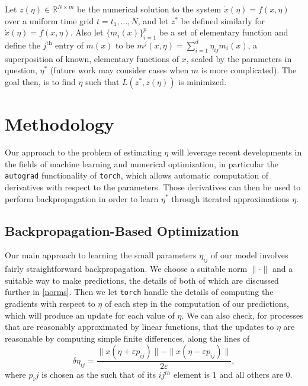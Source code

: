 \documentclass[12pt]{article}
\begin{document}
Let $z(\eta) \in \mathbb{R}^{N \times m}$ be the numerical solution to the system $\dot{x}(\eta) = f(x,\eta)$ over a uniform time grid $t=t_1,\ldots, N$, and let $z^*$ be defined similarly for $\dot{x}(\eta) = f(x,\eta)$. Also let $\{m_i(x)\}_{i=1}^p$ be a set of elementary function and define the $j^{\text{th}}$ entry of $m(x)$ to be $m^j(x, \eta) = \sum_{i=1}^d \eta_{ij} m_i(x)$, a superposition of known, elementary functions of $x$, scaled by the parameters in question, $\eta^*$ (future work may consider cases when $m$ is more complicated). The goal then, is to find $\eta$ such that $L(z^*, z(\eta))$ is minimized.






\section{Methodology}\label{methodology}


Our approach to the problem of estimating $\eta$ will leverage recent developments in the fields of machine learning and numerical optimization, in particular the \texttt{autograd} functionality of \texttt{torch}, which allows automatic computation of derivatives with respect to the parameters.\cite{biggs} Those derivatives can then be used to perform backpropagation in order to learn $\eta^*$ through iterated approximations $\eta$.



\subsection{Backpropagation-Based Optimization}

Our main approach to learning the small parameters $\eta_{ij}$ of our model involves fairly straightforward backpropagation. We choose a suitable norm $\|\cdot\|$ and a suitable way to make predictions, the details of both of which are discussed further in \ref{norms}. Then we let \texttt{torch} handle the details of computing the gradients with respect to $\eta$ of each step in the computation of our predictions, which will produce an update for each value of $\eta$. We can also check, for processes that are reasonably approximated by linear functions, that the updates to $\eta$ are reasonable by computing simple finite differences, along the lines of $$\delta\eta_{ij} = \frac{ \| x(\eta + \varepsilon p_{ij}) \| - \| x(\eta - \varepsilon p_{ij}) \| }{2 \varepsilon},$$ where $p_ij$ is chosen as the such that of its $ij^{th}$ element is $1$ and all others are $0$.
\end{document}
